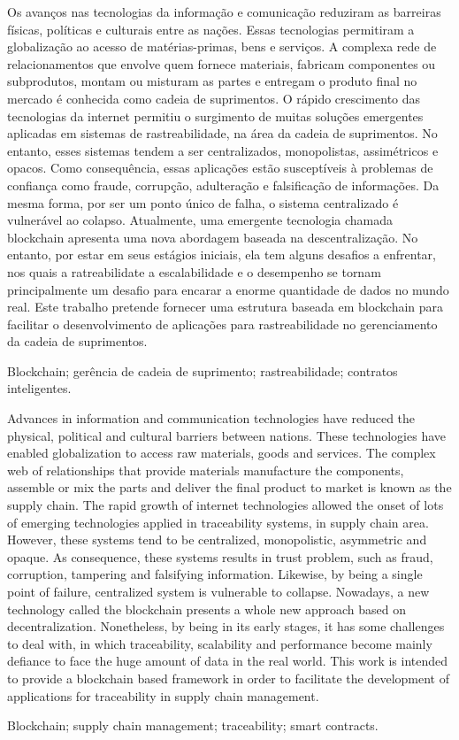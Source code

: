 
\resumo
Os avanços nas tecnologias da informação e comunicação reduziram as barreiras físicas, políticas e culturais entre as nações. Essas tecnologias permitiram a globalização ao acesso de matérias-primas, bens e serviços. A complexa rede de relacionamentos que envolve quem fornece materiais, fabricam componentes ou subprodutos, montam ou misturam as partes e entregam o produto final no mercado é conhecida como cadeia de suprimentos. O rápido crescimento das tecnologias da internet permitiu o surgimento de muitas soluções emergentes aplicadas em sistemas de rastreabilidade, na área da cadeia de suprimentos. No entanto, esses sistemas tendem a ser centralizados, monopolistas, assimétricos e opacos. Como consequência, essas aplicações estão susceptíveis à problemas de confiança como fraude, corrupção, adulteração e falsificação de informações. Da mesma forma, por ser um ponto único de falha, o sistema centralizado é vulnerável ao colapso. Atualmente, uma emergente tecnologia chamada blockchain apresenta uma nova abordagem baseada na descentralização. No entanto, por estar em seus estágios iniciais, ela tem alguns desafios a enfrentar, nos quais a ratreabilidate a escalabilidade e o desempenho se tornam principalmente um desafio para encarar a enorme quantidade de dados no mundo real. Este trabalho pretende fornecer uma estrutura baseada em blockchain para facilitar o desenvolvimento de aplicações para rastreabilidade no gerenciamento da cadeia de suprimentos.


\begin{keywords}
Blockchain; gerência de cadeia de suprimento; rastreabilidade; contratos inteligentes.
\end{keywords}


\abstract
Advances in information and communication technologies have reduced the physical, political and cultural barriers between nations. These technologies have enabled globalization to access raw materials, goods and services. The complex web of relationships that provide materials manufacture the components, assemble or mix the parts and deliver the final product to market is known as the supply chain. The rapid growth of internet technologies allowed the onset of  lots of emerging technologies applied in traceability systems, in supply chain area. However, these systems tend to be centralized, monopolistic, asymmetric and opaque. As consequence, these systems results in trust problem, such as fraud, corruption, tampering and falsifying information. Likewise, by being a single point of failure, centralized system is vulnerable to collapse. Nowadays, a new technology called the blockchain presents a whole new approach based on decentralization. Nonetheless, by being in its early stages, it has some challenges to deal with, in which traceability, scalability and performance become  mainly  defiance to face the huge amount of data in the real world. This work is intended to provide a blockchain based framework in order to facilitate the development of applications for traceability in supply chain management.

\begin{keywords}
Blockchain; supply chain management; traceability; smart contracts.
\end{keywords}
